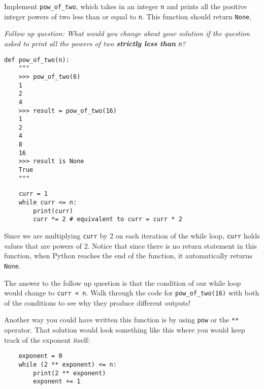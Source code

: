 \begin{blocksection}
\question Implement \lstinline{pow_of_two}, which takes in an integer \lstinline{n} and
prints all the positive integer powers of two less than or equal to \lstinline{n}. This function should return \lstinline{None}.

\textit{Follow up question: What would you change about your solution if the question asked to print all the powers of two \textbf{strictly less than} \lstinline{n}?}

\begin{lstlisting}
def pow_of_two(n):
    """
    >>> pow_of_two(6)
    1
    2
    4
    >>> result = pow_of_two(16)
    1
    2
    4
    8
    16
    >>> result is None
    True
    """
\end{lstlisting}
\begin{solution}[2in]
\begin{lstlisting}
    curr = 1
    while curr <= n:
        print(curr)
        curr *= 2 # equivalent to curr = curr * 2
\end{lstlisting}
Since we are multiplying \lstinline{curr} by 2 on each iteration of the while loop, \lstinline{curr} holds values that are powers of 2.
Notice that since there is no return statement in this function, when Python reaches the end of the function, it automatically returns \lstinline{None}.

The answer to the follow up question is that the condition of our while loop would change to \lstinline{curr < n}.
Walk through the code for \lstinline$pow_of_two(16)$ with both of the conditions to see why they produce different outputs!

Another way you could have written this function is by using \lstinline{pow} or the \lstinline{**} operator. That solution would look something like this where you would keep track of the exponent itself:

\begin{lstlisting}
    exponent = 0
    while (2 ** exponent) <= n:
        print(2 ** exponent)
        exponent += 1
\end{lstlisting}
\end{solution}
\end{blocksection}